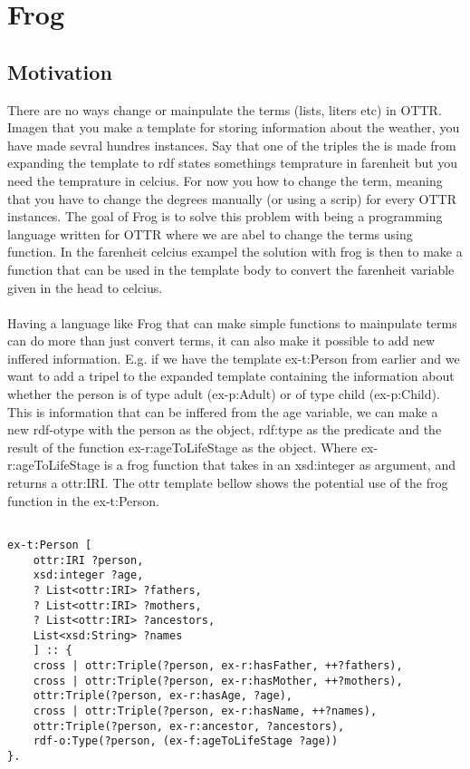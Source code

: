 \section{Frog}

\subsection{Motivation}
There are no ways change or mainpulate the terms (lists, liters etc) in OTTR. Imagen that you 
make a template for storing information about the weather, you have made sevral hundres instances. Say that one of the 
triples the is made from expanding the template to rdf states somethings temprature in farenheit but you need the temprature in celcius.
For now you how to change the term, meaning that you have to change the degrees manually (or using a scrip) for every OTTR instances.
The goal of Frog is to solve this problem with being a programming language written for OTTR where we are abel to change 
the terms using function. In the farenheit celcius exampel the solution with frog is then to make a function that can be used 
in the template body to convert the farenheit variable given in the head to celcius. 
\\ \\
Having a language like Frog that can make simple functions to mainpulate terms can do more than just convert terms, it can 
also make it possible to add new inffered information. E.g. if we have the template ex-t:Person from earlier
and we want to add a tripel to the expanded template containing the information about whether the person is of type adult (ex-p:Adult) or of type child (ex-p:Child). This 
is information that can be inffered from the age variable, we can make a new rdf-otype with the person as the object, rdf:type as the 
predicate and the result of the function ex-r:ageToLifeStage as the object. Where ex-r:ageToLifeStage is a frog function that takes in an xsd:integer
as argument, and returns a ottr:IRI. The ottr template bellow shows the potential use of the frog function in 
the ex-t:Person.

\begin{lstlisting}[frame=single]
    
ex-t:Person [
    ottr:IRI ?person,
    xsd:integer ?age,
    ? List<ottr:IRI> ?fathers,
    ? List<ottr:IRI> ?mothers,
    ? List<ottr:IRI> ?ancestors,
    List<xsd:String> ?names
    ] :: {
    cross | ottr:Triple(?person, ex-r:hasFather, ++?fathers),
    cross | ottr:Triple(?person, ex-r:hasMother, ++?mothers),
    ottr:Triple(?person, ex-r:hasAge, ?age),
    cross | ottr:Triple(?person, ex-r:hasName, ++?names),
    ottr:Triple(?person, ex-r:ancestor, ?ancestors),
    rdf-o:Type(?person, (ex-f:ageToLifeStage ?age))
}.
\end{lstlisting}

